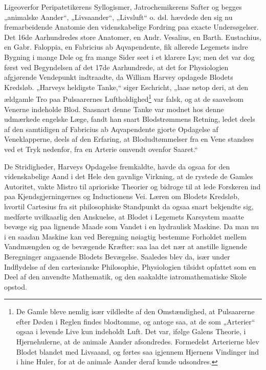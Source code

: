 \documentclass[12pt,a4paper]{book}
\begin{document}
\setcounter{footnote}{0}
Ligeoverfor Peripatetikerens Syllogismer, Jatrochemikerens Safter og
begges „animalske Aander“, „Livsaander“, „Livsluft“ o. dsl. hævdede
den sig nu fremarbeidende Anatomie den videnskabelige Fordring paa
exacte Undersøgelser. Det 16de Aarhundredes store Anatomer, en Andr.
Vesalius, en Barth. Eustachius, en Gabr. Faloppia, en Fabricius ab
Aqvapendente, fik allerede Legemets indre Bygning i mange Dele og fra
mange Sider seet i et klarere Lys; men det var dog først ved
Begyndelsen af det 17de Aarhundrede, at det for Physiologien
afgjørende Vendepunkt indtraadte, da William Harvey opdagede Blodets
Kredsløb. „Harveys heldigste Tanke,“ siger Eschricht, „laae netop
deri, at den ældgamle Tro paa Pulsaarernes
Luftholdighed\footnote{De Gamle bleve nemlig især vildledte af den
Omstændighed, at Pulsaarerne efter Døden i Reglen findes blodtomme,
og antoge saa, at de som „Arterier“ ogsaa i levende Live kun
indeholdt Luft. Det var, ifølge Galens Theorie, i Hjernehulerne, at
de animale Aander afsondredes. Formedelst Arterierne blev Blodet
blandet med Livsaand, og førtes saa igjennem Hjernens Vindinger ind i
hine Huler, for at de animale Aander deraf kunde udsondres.} var
falsk, og at de saavelsom
Venerne indeholde Blod. Saasnart denne Tanke var modnet hos denne
udmærkede engelske Læge, fandt han snart Blodstrømmens Retning,
ledet deels af den samtidigen af Fabricius ab Aqvapendente gjorte
Opdagelse af Veneklapperne, deels af den Erfaring, at
Blodudtømmelser fra en Vene standses ved et Tryk nedenfor, fra en
Arterie omvendt ovenfor Saaret.“

De Stridigheder, Harveys Opdagelse fremkaldte, havde da ogsaa for den
videnskabelige Aand i det Hele den gavnlige Virkning, at de rystede
de Gamles Autoritet, vakte Mistro til aprioriske Theorier og bidroge
til at lede Forskeren ind paa Kjendsgjerningernes og Inductionens
Vei. Læren om Blodets Kredsløb, hvortil Cartesius fra sit
philosophiske Standpunkt da ogsaa snart bekjendte sig, medførte
uvilkaarlig den Anskuelse, at Blodet i Legemets Karsystem maatte
bevæge sig paa lignende Maade som Vandet i en hydraulisk Maskine. Da
man nu i en saadan Maskine kan ved Beregning nøiagtig bestemme
Forholdet mellem Vandmængden og de bevægende Kræfter: saa laa det
nær at anstille lignende Beregninger angaaende Blodets Bevægelse.
Saaledes blev da, især under Indflydelse af den cartesianske
Philosophie, Physiologien tilsidst opfattet som en Deel af den
anvendte Mathematik, og den saakaldte iatromathematiske Skole
opstod.
\end{document}
